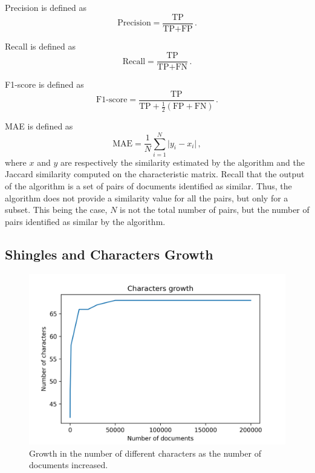 \documentclass[runningheads]{llncs}
\begin{document}
Precision is defined as 
\[
  \text{Precision} = \frac{\text{TP}}{\text{TP} + \text{FP}}\,.
\]

Recall is defined as
\[
  \text{Recall} = \frac{\text{TP}}{\text{TP} + \text{FN}}\,.
\]

F1-score is defined as
\[
  \text{F1-score} = \frac{\text{TP}}{\text{TP} + \frac{1}{2}(\text{FP} + \text{FN})}\,.
\]

MAE is defined as
\[
  \text{MAE} = \frac{1}{N}\sum_{i=1}^N \lvert y_i - x_i \rvert \,,
\]
where $x$ and $y$ are respectively the similarity estimated by the algorithm and the Jaccard similarity computed on the characteristic matrix. Recall that the output of the algorithm is a set of pairs of documents identified as similar. Thus, the algorithm does not provide a similarity value for all the pairs, but only for a subset. This being the case, $N$ is not the total number of pairs, but the number of pairs identified as similar by the algorithm. 

\subsection{Shingles and Characters Growth}
\label{subsec:experiments:shingles}

\begin{figure}
  \center
  \includegraphics[width=1\textwidth]{../img/char_growth.png}
  \caption{Growth in the number of different characters as the number of documents increased.} 
  \label{fig:experiments:char_growth}
\end{figure}
\end{document}
